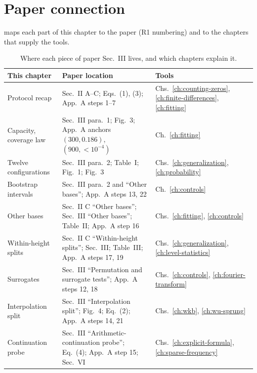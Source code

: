 \section{Paper connection}\label{sec:paper-memorization-paper}

 maps each part of this chapter to the paper (R1 numbering) and to the chapters that supply the tools.

\begin{table}[htbp]\centering
\caption{Where each piece of paper Sec.~III lives, and which chapters explain it.}
\label{tab:paper-memorization-map}
\small
\begin{tabular}{p{3.6cm}p{5.2cm}p{4.2cm}}
\toprule
This chapter & Paper location & Tools \\
\midrule
Protocol recap & Sec.~II A--C; Eqs.~(1), (3); App.~A steps 1--7 & Chs.~\ref{ch:counting-zeros}, \ref{ch:finite-differences}, \ref{ch:fitting} \\
Capacity, coverage law & Sec.~III para.~1; Fig.~3; App.~A anchors $(300,0.186)$, $(900,<10^{-4})$ & Ch.~\ref{ch:fitting} \\
Twelve configurations & Sec.~III para.~2; Table~I; Fig.~1; Fig.~3 & Chs.~\ref{ch:generalization}, \ref{ch:probability} \\
Bootstrap intervals & Sec.~III para.~2 and ``Other bases''; App.~A steps 13, 22 & Ch.~\ref{ch:controls} \\
Other bases & Sec.~II C ``Other bases''; Sec.~III ``Other bases''; Table~II; App.~A step 16 & Chs.~\ref{ch:fitting}, \ref{ch:controls} \\
Within-height splits & Sec.~II C ``Within-height splits''; Sec.~III; Table~III; App.~A steps 17, 19 & Chs.~\ref{ch:generalization}, \ref{ch:level-statistics} \\
Surrogates & Sec.~III ``Permutation and surrogate tests''; App.~A steps 12, 18 & Chs.~\ref{ch:controls}, \ref{ch:fourier-transform} \\
Interpolation split & Sec.~III ``Interpolation split''; Fig.~4; Eq.~(2); App.~A steps 14, 21 & Chs.~\ref{ch:wkb}, \ref{ch:wu-sprung} \\
Continuation probe & Sec.~III ``Arithmetic-continuation probe''; Eq.~(4); App.~A step 15; Sec.~VI & Chs.~\ref{ch:explicit-formula}, \ref{ch:sparse-frequency} \\
\bottomrule
\end{tabular}
\end{table}

